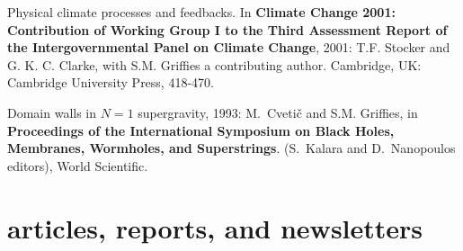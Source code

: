 \begin{etaremune}
\item Physical climate processes and feedbacks. In {\bf Climate Change
    2001: Contribution of Working Group I to the Third Assessment
    Report of the Intergovernmental Panel on Climate Change}, 2001:
  T.F. Stocker and G. K. C. Clarke, with S.M. Grif\/f\/ies a
  contributing author.  Cambridge, UK: Cambridge University Press,
  418-470.

\item Domain walls in $N=1$ supergravity, 1993: M.\ Cveti\v c and S.M. Grif\/f\/ies, in {\bf Proceedings of the International
    Symposium on Black Holes, Membranes, Wormholes, and Superstrings}.
  (S.\ Kalara and D.\ Nanopoulos editors), World Scientific.

\end{etaremune}

\section*{\sc \color{Maroon} articles, reports, and newsletters}

